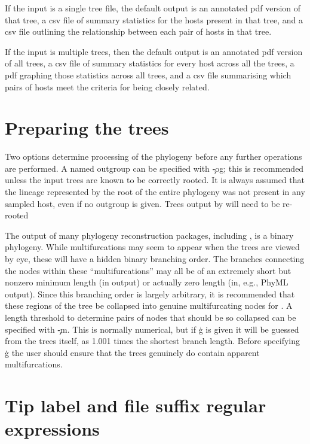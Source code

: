 If the input is a single tree file, the default output is an annotated pdf version of that tree, a csv file of summary statistics for the hosts present in that tree, and a csv file outlining the relationship between each pair of hosts in that tree.

If the input is multiple trees, then the default output is an annotated pdf version of all trees, a csv file of summary statistics for every host across all the trees, a pdf graphing those statistics across all trees, and a csv file summarising which pairs of hosts meet the criteria for being closely related.

\section{Preparing the trees}

Two options determine processing of the phylogeny before any further operations are performed.
A named outgroup can be specified with \c{-og}; this is recommended unless the input trees are known to be correctly rooted.
It is always assumed that the lineage represented by the root of the entire phylogeny was not present in any sampled host, even if no outgroup is given.
Trees output by \pmt will need to be re-rooted

The output of many phylogeny reconstruction packages, including \R, is a binary phylogeny.
While multifurcations may seem to appear when the trees are viewed by eye, these will have a hidden binary branching order.
The branches connecting the nodes within these ``multifurcations'' may all be of an extremely short but nonzero minimum length (in \R output) or actually zero length (in, e.g., PhyML output).
Since this branching order is largely arbitrary, it is recommended that these regions of the tree be collapsed into genuine multifurcating nodes for \pat.
A length threshold to determine pairs of nodes that should be so collapsed can be specified with \c{-m}.
This is normally numerical, but if \c{g} is given it will be guessed from the trees itself, as 1.001 times the shortest branch length.
Before specifying \c{g} the user should ensure that the trees genuinely do contain apparent multifurcations.

\section{Tip label and file suffix regular expressions} \label{sec:regexes}

